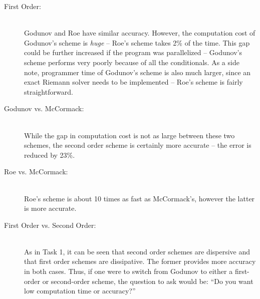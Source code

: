 \begin{description}
    \item [First Order:]\hfill \\
    Godunov and Roe have similar accuracy. However, the computation cost of Godunov's scheme is \emph{huge} -- Roe's scheme takes 2\% of the time. This gap could be further increased if the program was parallelized -- Godunov's scheme performs very poorly because of all the conditionals. As a side note, programmer time of Godunov's scheme is also much larger, since an exact Riemann solver needs to be implemented -- Roe's scheme is fairly straightforward.
    \item [Godunov vs. McCormack:]\hfill\\
    While the gap in computation cost is not as large between these two schemes, the second order scheme is certainly more accurate -- the error is reduced by 23\%.
    \item [Roe vs. McCormack:]\hfill\\
    Roe's scheme is about 10 times as fast as McCormack's, however the latter is more accurate.
    \item [First Order vs. Second Order:]\hfill\\
    As in Task 1, it can be seen that second order schemes are dispersive and that first order schemes are dissipative. The former provides more accuracy in both cases. Thus, if one were to switch from Godunov to either a first-order or second-order scheme, the question to ask would be: ``Do you want low computation time or accuracy?''
\end{description}
